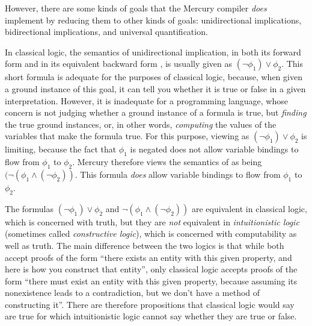 However, there are some kinds of goals
that the Mercury compiler \emph{does} implement
by reducing them to other kinds of goals:
unidirectional implications,
bidirectional implications,
and universal quantification.

In classical logic,
the semantics of unidirectional implication,
in both its forward  form
and in its equivalent backward form ,
is usually given as $(\lnot \phi_1) \lor \phi_2$.
This short formula is adequate for the purposes of classical logic,
because, when given a ground instance of this goal,
it can tell you whether it is true or false in a given interpretation.
However, it is inadequate for a programming language,
whose concern is not judging whether a ground instance of a formula is true,
but \emph{finding} the true ground instances,
or, in other words,
\emph{computing} the values of the variables that make the formula true.
For this purpose,
viewing  as $(\lnot \phi_1) \lor \phi_2$ is limiting,
because the fact that $\phi_1$ is negated
does not allow variable bindings to flow from $\phi_1$ to $\phi_2$.
Mercury therefore views the semantics of 
as being $(\lnot (\phi_1 \land (\lnot \phi_2))$.
This formula \emph{does} allow variable bindings
to flow from $\phi_1$ to $\phi_2$.

The formulas
$(\lnot \phi_1) \lor \phi_2$ and
$\lnot (\phi_1 \land (\lnot \phi_2))$
are equivalent in classical logic,
which is concerned with truth,
but they are \emph{not} equivalent in \emph{intuitionistic logic}
(sometimes called \emph{constructive logic}),
which is concerned with computability as well as truth.
The main difference between the two logics is that
while both accept proofs of the form
``there exists an entity with this given property,
and here is how you construct that entity'',
only classical logic accepts proofs of the form
``there must exist an entity with this given property,
because assuming its nonexistence leads to a contradiction,
but we don't have a method of constructing it''.
There are therefore propositions
that classical logic would say are true
for which intuitionistic logic cannot say whether they are true or false.

